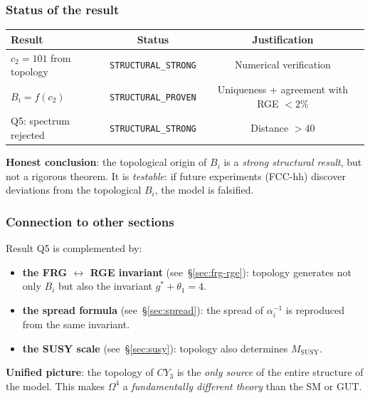 \documentclass[11pt,a4paper]{article}
\newcommand{\CY}{\ensuremath{CY_3}}
\newcommand{\Om}{\ensuremath{\Omega^4}}
\theoremstyle{definition}
\begin{document}
\subsubsection{Status of the result}

\begin{center}
\begin{tabular}{lcc}
\toprule
Result & Status & Justification \\
\midrule
$c_2 = 101$ from topology & \texttt{STRUCTURAL\_STRONG} &
Numerical verification \\
$B_i = f(c_2)$ & \texttt{STRUCTURAL\_PROVEN} &
Uniqueness + agreement with RGE $< 2\%$ \\
Q5: spectrum rejected & \texttt{STRUCTURAL\_STRONG} &
Distance $> 40$ \\
\bottomrule
\end{tabular}
\end{center}

\medskip\noindent
\textbf{Honest conclusion}: the topological origin of $B_i$ is
a \emph{strong structural result}, but not a rigorous theorem.
It is \emph{testable}: if future experiments (FCC-hh)
discover deviations from the topological $B_i$, the model
is falsified.

\subsubsection{Connection to other sections}

Result Q5 is complemented by:
\begin{itemize}
    \item \textbf{the FRG $\leftrightarrow$ RGE invariant}
          (see~\S\ref{sec:frg-rge}): topology generates
          not only $B_i$ but also the invariant $g^* + \theta_1 = 4$.
    \item \textbf{the spread formula} (see~\S\ref{sec:spread}):
          the spread of $\alpha_i^{-1}$ is reproduced from
          the same invariant.
    \item \textbf{the SUSY scale} (see~\S\ref{sec:susy}):
          topology also determines $M_{\text{SUSY}}$.
\end{itemize}

\medskip\noindent
\textbf{Unified picture}: the topology of $\CY$ is the \emph{only
source} of the entire structure of the model. This makes $\Om$ a
\emph{fundamentally different theory} than the SM or GUT.

\end{document}
